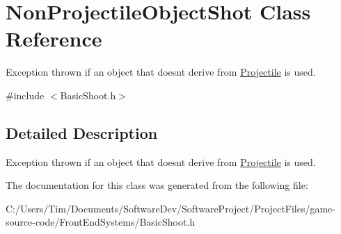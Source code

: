 \hypertarget{class_non_projectile_object_shot}{}\section{Non\+Projectile\+Object\+Shot Class Reference}
\label{class_non_projectile_object_shot}


Exception thrown if an object that doesnt derive from \hyperlink{class_projectile}{Projectile} is used.  




{\ttfamily \#include $<$Basic\+Shoot.\+h$>$}



\subsection{Detailed Description}
Exception thrown if an object that doesnt derive from \hyperlink{class_projectile}{Projectile} is used. 

The documentation for this class was generated from the following file\+:\begin{DoxyCompactItemize}
\item 
C\+:/\+Users/\+Tim/\+Documents/\+Software\+Dev/\+Software\+Project/\+Project\+Files/game-\/source-\/code/\+Front\+End\+Systems/Basic\+Shoot.\+h\end{DoxyCompactItemize}
